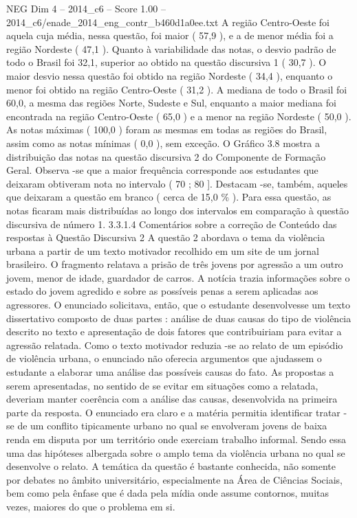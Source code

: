 \begin{textsample}{NEG Dim 4 – 2014\_c6 – Score 1.00 – 2014\_c6/enade\_2014\_eng\_contr\_b460d1a0ee.txt}
A região Centro-Oeste foi aquela cuja média, nessa questão, foi maior ( 57,9 ), e a de menor média foi a região Nordeste ( 47,1 ).
Quanto à variabilidade das notas, o desvio padrão de todo o Brasil foi 32,1, superior ao obtido na questão discursiva 1 ( 30,7 ).
O maior desvio nessa questão foi obtido na região Nordeste ( 34,4 ), enquanto o menor foi obtido na região Centro-Oeste ( 31,2 ).
A mediana de todo o Brasil foi 60,0, a mesma das regiões Norte, Sudeste e Sul, enquanto a maior mediana foi encontrada na região Centro-Oeste ( 65,0 ) e a menor na região Nordeste ( 50,0 ).
As notas máximas ( 100,0 ) foram as mesmas em todas as regiões do Brasil, assim como as notas mínimas ( 0,0 ), sem exceção.
O Gráfico 3.8 mostra a distribuição das notas na questão discursiva 2 do Componente de Formação Geral.
Observa -se que a maior frequência corresponde aos estudantes que deixaram obtiveram nota no intervalo ( 70 ; 80 ].
Destacam -se, também, aqueles que deixaram a questão em branco ( cerca de 15,0 \% ).
Para essa questão, as notas ficaram mais distribuídas ao longo dos intervalos em comparação à questão discursiva de número 1. 3.3.1.4 Comentários sobre a correção de Conteúdo das respostas à Questão Discursiva 2 A questão 2 abordava o tema da violência urbana a partir de um texto motivador recolhido em um site de um jornal brasileiro.
O fragmento relatava a prisão de três jovens por agressão a um outro jovem, menor de idade, guardador de carros.
A notícia trazia informações sobre o estado do jovem agredido e sobre as possíveis penas a serem aplicadas aos agressores.
O enunciado solicitava, então, que o estudante desenvolvesse um texto dissertativo composto de duas partes : análise de duas causas do tipo de violência descrito no texto e apresentação de dois fatores que contribuiriam para evitar a agressão relatada.
Como o texto motivador reduzia -se ao relato de um episódio de violência urbana, o enunciado não oferecia argumentos que ajudassem o estudante a elaborar uma análise das possíveis causas do fato.
As propostas a serem apresentadas, no sentido de se evitar em situações como a relatada, deveriam manter coerência com a análise das causas, desenvolvida na primeira parte da resposta.
O enunciado era claro e a matéria permitia identificar tratar -se de um conflito tipicamente urbano no qual se envolveram jovens de baixa renda em disputa por um território onde exerciam trabalho informal.
Sendo essa uma das hipóteses albergada sobre o amplo tema da violência urbana no qual se desenvolve o relato.
A temática da questão é bastante conhecida, não somente por debates no âmbito universitário, especialmente na Área de Ciências Sociais, bem como pela ênfase que é dada pela mídia onde assume contornos, muitas vezes, maiores do que o problema em si.

\end{textsample}
